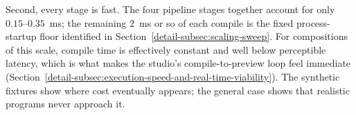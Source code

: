 Second, every stage is fast.
The four pipeline stages together account for only $0.15$--$0.35$~ms; the remaining $2$~ms or so of each compile is the
fixed process-startup floor identified in Section~\ref{detail-subsec:scaling-sweep}.
For compositions of this scale, compile time is effectively constant and well below perceptible latency, which is what
makes the studio's compile-to-preview loop feel immediate
(Section~\ref{detail-subsec:execution-speed-and-real-time-viability}).
The synthetic fixtures show where cost eventually appears; the general case shows that realistic programs never approach
it.
